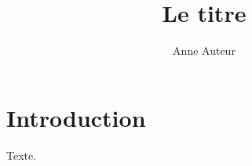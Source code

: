 \documentclass[french]{smfart}
\title{Le titre}
\author{Anne Auteur}
\begin{document}
\maketitle
\section{Introduction}
Texte.
\end{document}

